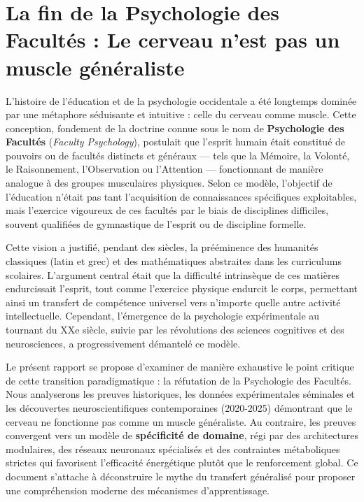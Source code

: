 

\section{La fin de la Psychologie des Facultés : Le cerveau n'est pas un muscle généraliste}

L'histoire de l'éducation et de la psychologie occidentale a été longtemps dominée par une métaphore
séduisante et intuitive : celle du \og cerveau comme muscle\fg{}. Cette conception, fondement de la
doctrine connue sous le nom de \textbf{Psychologie des Facultés} (\textit{Faculty Psychology}),
postulait que l'esprit humain était constitué de \og pouvoirs\fg{} ou de \og facultés\fg{} distincts
et généraux — tels que la Mémoire, la Volonté, le Raisonnement, l'Observation ou l'Attention —
fonctionnant de manière analogue à des groupes musculaires physiques.\cite{II-1-1-ref1} Selon ce
modèle, l'objectif de l'éducation n'était pas tant l'acquisition de connaissances spécifiques
exploitables, mais l'exercice vigoureux de ces facultés par le biais de disciplines difficiles,
souvent qualifiées de \og gymnastique de l'esprit\fg{} ou de \og discipline
formelle\fg{}.\cite{II-1-1-ref3}

Cette vision a justifié, pendant des siècles, la prééminence des humanités classiques (latin et
grec) et des mathématiques abstraites dans les curriculums scolaires. L'argument central était que
la difficulté intrinsèque de ces matières \og endurcissait\fg{} l'esprit, tout comme l'exercice
physique endurcit le corps, permettant ainsi un transfert de compétence universel vers n'importe
quelle autre activité intellectuelle.\cite{II-1-1-ref5} Cependant, l'émergence de la psychologie
expérimentale au tournant du XXe siècle, suivie par les révolutions des sciences cognitives et des
neurosciences, a progressivement démantelé ce modèle.

Le présent rapport se propose d'examiner de manière exhaustive le point critique de cette transition
paradigmatique : la réfutation de la Psychologie des Facultés. Nous analyserons les preuves
historiques, les données expérimentales séminales et les découvertes neuroscientifiques
contemporaines (2020-2025) démontrant que le cerveau ne fonctionne pas comme un muscle généraliste.
Au contraire, les preuves convergent vers un modèle de \textbf{spécificité de domaine}, régi par des
architectures modulaires, des réseaux neuronaux spécialisés et des contraintes métaboliques strictes
qui favorisent l'efficacité énergétique plutôt que le renforcement global.\cite{II-1-1-ref6} Ce
document s'attache à déconstruire le mythe du transfert généralisé pour proposer une compréhension
moderne des mécanismes d'apprentissage.



